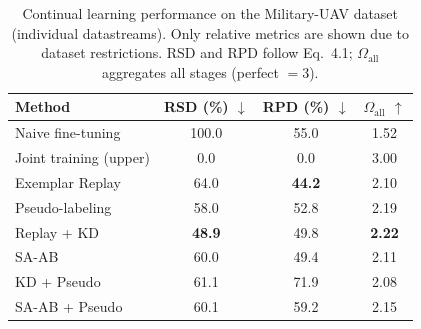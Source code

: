 \begin{table}[t]
\centering
\caption{Continual learning performance on the Military-UAV dataset
(individual datastreams). Only relative metrics are shown due to dataset
restrictions. RSD and RPD follow Eq.~4.1; $\Omega_{\text{all}}$ aggregates
all stages (perfect $= 3$).}
\label{tab:military-overall}
\begin{tabular}{l ccc}
\toprule
Method & RSD (\%) $\downarrow$ & RPD (\%) $\downarrow$ & $\Omega_{\text{all}}$ $\uparrow$ \\
\midrule
  Naive fine-tuning          & 100.0 & 55.0 & 1.52 \\
  Joint training (upper)     & 0.0 & 0.0 & 3.00 \\
  \midrule
  Exemplar Replay            & 64.0 & \textbf{44.2} & 2.10 \\
  Pseudo-labeling            & 58.0 & 52.8 & 2.19 \\
  Replay + KD                & \textbf{48.9} & 49.8 & \textbf{2.22} \\
  SA-AB                      & 60.0 & 49.4 & 2.11 \\
  \midrule
  KD + Pseudo                & 61.1 & 71.9 & 2.08 \\
  SA-AB + Pseudo             & 60.1 & 59.2 & 2.15 \\
\bottomrule
\end{tabular}
\end{table}
